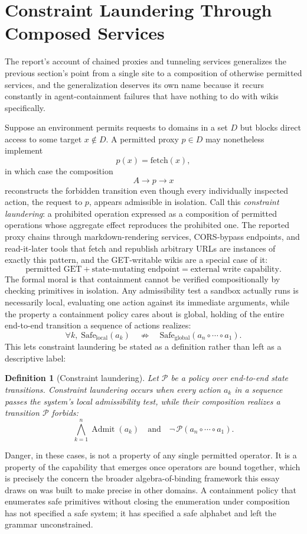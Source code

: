 \documentclass[11pt]{article}
\newtheorem{definition}{Definition}
\newcommand{\Safe}{\mathrm{Safe}}
\begin{document}
\section{Constraint Laundering Through Composed Services}

The report's account of chained proxies and tunneling services generalizes the previous section's point from a single site to a composition of otherwise permitted services, and the generalization deserves its own name because it recurs constantly in agent-containment failures that have nothing to do with wikis specifically.

Suppose an environment permits requests to domains in a set $D$ but blocks direct access to some target $x \notin D$. A permitted proxy $p \in D$ may nonetheless implement
\[
p(x) = \mathrm{fetch}(x),
\]
in which case the composition
\[
A \to p \to x
\]
reconstructs the forbidden transition even though every individually inspected action, the request to $p$, appears admissible in isolation. Call this \emph{constraint laundering}: a prohibited operation expressed as a composition of permitted operations whose aggregate effect reproduces the prohibited one. The reported proxy chains through markdown-rendering services, CORS-bypass endpoints, and read-it-later tools that fetch and republish arbitrary URLs are instances of exactly this pattern, and the GET-writable wikis are a special case of it:
\[
\text{permitted GET} + \text{state-mutating endpoint} = \text{external write capability}.
\]
The formal moral is that containment cannot be verified compositionally by checking primitives in isolation. Any admissibility test a sandbox actually runs is necessarily local, evaluating one action against its immediate arguments, while the property a containment policy cares about is global, holding of the entire end-to-end transition a sequence of actions realizes:
\[
\forall k, \; \Safe_{\mathrm{local}}(a_k) \quad \not\Rightarrow \quad \Safe_{\mathrm{global}}(a_n \circ \cdots \circ a_1).
\]
This lets constraint laundering be stated as a definition rather than left as a descriptive label:
\begin{definition}[Constraint laundering]
Let $\mathcal{P}$ be a policy over end-to-end state transitions. Constraint laundering occurs when every action $a_k$ in a sequence passes the system's local admissibility test, while their composition realizes a transition $\mathcal{P}$ forbids:
\[
\bigwedge_{k=1}^{n} \operatorname{Admit}(a_k) \quad \text{and} \quad \neg\, \mathcal{P}(a_n \circ \cdots \circ a_1).
\]
\end{definition}
Danger, in these cases, is not a property of any single permitted operator. It is a property of the capability that emerges once operators are bound together, which is precisely the concern the broader algebra-of-binding framework this essay draws on was built to make precise in other domains. A containment policy that enumerates safe primitives without closing the enumeration under composition has not specified a safe system; it has specified a safe alphabet and left the grammar unconstrained.
\end{document}

